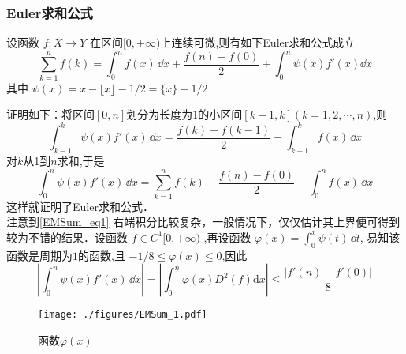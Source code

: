 \subsubsection{Euler求和公式}
\begin{theorem}{}
    设函数 $f:X\to Y$ 在区间$[0,+\infty)$上连续可微,则有如下Euler求和公式成立	
        \begin{equation}\label{EMSum_eq1} 
            \sum_{k=1}^{n}f(k)=\int_{0}^{n}f(x)\,\dd x
            +\frac{f(n)-f(0)}{2}+\int_{0}^{n}\psi(x)f'(x)\dd x
        \end{equation}
    其中 $\psi(x)=x-\lfloor x \rfloor-1/2=\{x\}-1/2$
\end{theorem}
证明如下：将区间$[0,n]$划分为长度为$1$的小区间$[k-1,k](k=1,2,\cdots,n)$,则
​\[
    \int_{k-1}^{k}\psi(x)f'(x)\,\dd x
    =\frac{f(k)+f(k-1)}{2}-\int_{k-1}^{k}f(x)\,\dd x
\]
​对$k$从1到$n$求和,于是
​\[
    \int_{0}^{n}\psi(x)f'(x)\,\dd x
    =\sum_{k=1}^{n}f(k)-\frac{f(n)-f(0)}{2}-\int_{0}^{n}f(x)\,\dd x
\]
这样就证明了Euler求和公式．
\\注意到\autoref{EMSum_eq1} 右端积分比较复杂，一般情况下，仅仅估计其上界便可得到较为不错的结果．设函数 $f\in{C^1[0,+\infty)}$ ,再设函数
$\varphi(x)=\displaystyle{\int_{0}^{x}\psi(t)\,\dd t}$,
易知该函数是周期为$1$的函数,且
 $-1/8\leqslant\varphi(x)\leqslant 0$,因此
\[
    \left|\int_{0}^{n}\psi(x)f'(x)\,\dd x\right|
    =\left|\int_{0}^{n}\varphi(x)D^2(f)\mathrm{d}x\right|
    \leqslant\frac{|f'(n)-f'(0)|}{8}
\]
\begin{figure}[ht]
\centering
\texttt{[image: ./figures/EMSum\_1.pdf]}
\caption{函数$\varphi(x)$} \label{EMSum_fig1}
\end{figure}

